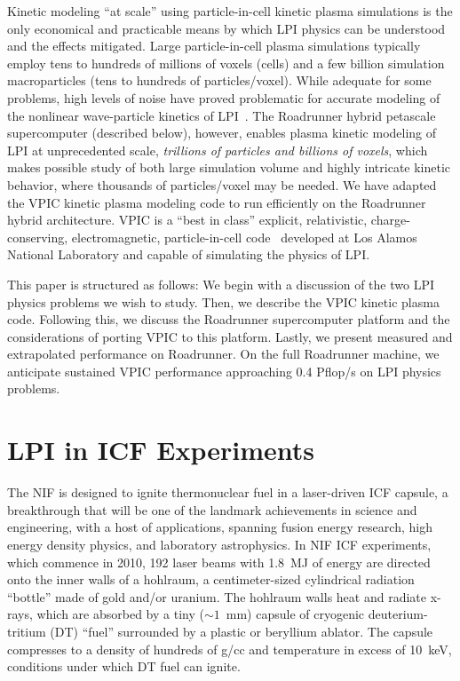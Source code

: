 \documentclass[letter,10pt]{article}
\begin{document}
Kinetic modeling ``at scale'' using particle-in-cell kinetic plasma
simulations is the only economical and practicable means by which LPI
physics can be understood and the effects mitigated.
Large particle-in-cell plasma 
simulations typically employ tens to hundreds of millions of voxels
(cells) and a few billion simulation macroparticles (tens to hundreds
of particles/voxel).  While adequate for some problems, high levels of
noise have proved problematic for accurate modeling of the nonlinear
wave-particle kinetics of LPI~\cite{Yin_et_al_Phys_Plasmas_2006}.  The
Roadrunner hybrid petascale supercomputer (described below), however,
enables plasma kinetic modeling of LPI at unprecedented scale,
\textit{trillions of particles and billions of voxels}, which makes 
possible study of both large
simulation volume and highly intricate kinetic behavior, where
thousands of particles/voxel may be needed.  We have adapted the VPIC
kinetic plasma modeling code to run efficiently on the Roadrunner
hybrid architecture.  VPIC is a ``best in class'' explicit,
relativistic, charge-conserving, electromagnetic, particle-in-cell
code~\cite{Bowers_et_al_Phys_Plasmas_2007} developed at Los Alamos
National Laboratory and capable of simulating the physics of LPI.

This paper is structured as follows: We begin with a discussion of the
two LPI physics problems we wish to study.  Then, we describe the VPIC
kinetic plasma code.  Following this, we discuss the Roadrunner
supercomputer platform and the considerations of porting VPIC to this
platform.  Lastly, we present measured and extrapolated performance on
Roadrunner.  On the full Roadrunner machine, we anticipate sustained
VPIC performance approaching 0.4 Pflop/s on LPI physics problems.

\section{LPI in ICF Experiments}

The NIF is designed to ignite thermonuclear fuel in a laser-driven ICF
capsule, a breakthrough that will be one of the landmark achievements
in science and engineering, with a host of applications, spanning
fusion energy research, high energy density physics, and
laboratory astrophysics.  In NIF ICF experiments, which commence in
2010, 192 laser beams with 1.8~MJ of energy are directed onto the
inner walls of a hohlraum, a centimeter-sized cylindrical radiation
``bottle'' made of gold and/or uranium.  The hohlraum walls heat and
radiate x-rays, which are absorbed by a tiny ($\sim 1$~mm) capsule of
cryogenic deuterium-tritium (DT) ``fuel'' surrounded by a plastic or
beryllium ablator.  The capsule compresses to a density of hundreds of
g/cc and temperature in excess of 10~keV, conditions under which DT
fuel can ignite.
\end{document}
